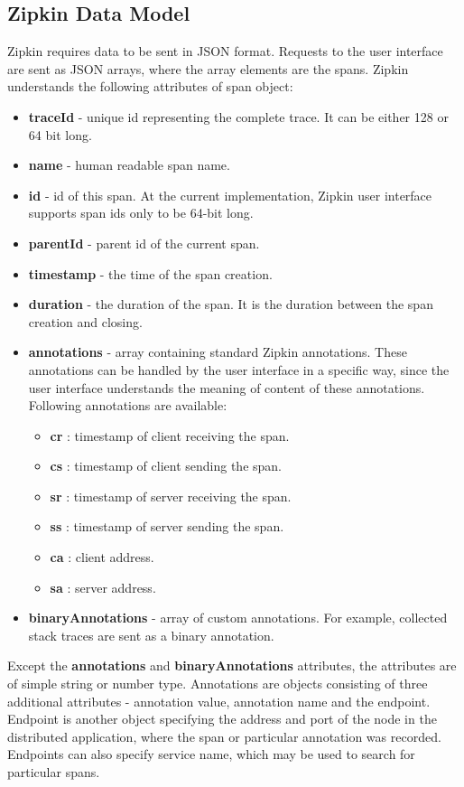 \subsection{Zipkin Data Model}
Zipkin requires data to be sent in JSON format. Requests to the user interface are sent as JSON arrays, where the array elements are the spans. Zipkin understands the following attributes of span object:
\begin{itemize}
	\item \textbf{traceId} - unique id representing the complete trace. It can be either 128 or 64 bit long.
	\item \textbf{name} - human readable span name.
	\item \textbf{id} - id of this span. At the current implementation, Zipkin user interface supports span ids only to be 64-bit long.
	\item \textbf{parentId} - parent id of the current span.
	\item \textbf{timestamp} - the time of the span creation.
	\item \textbf{duration} - the duration of the span. It is the duration between the span creation and closing.
	\item \textbf{annotations} - array containing standard Zipkin annotations. These annotations can be handled by the user interface in a specific way, since the user interface understands the meaning of content of these annotations. Following annotations are available:
	\begin{itemize}
		\item \textbf{cr} : timestamp of client receiving the span.
		\item \textbf{cs} : timestamp of client sending the span.
		\item \textbf{sr} : timestamp of server receiving the span.
		\item \textbf{ss} : timestamp of server sending the span.
		\item \textbf{ca} : client address.
		\item \textbf{sa} : server address.
	\end{itemize}
	\item \textbf{binaryAnnotations} - array of custom annotations. For example, collected stack traces are sent as a binary annotation.
\end{itemize}

Except the \textbf{annotations} and \textbf{binaryAnnotations} attributes, the attributes are of simple string or number type. Annotations are objects consisting of three additional attributes - annotation value, annotation name and the endpoint. Endpoint is another object specifying the address and port of the node in the distributed application, where the span or particular annotation was recorded. Endpoints can also specify service name, which may be used to search for particular spans.

